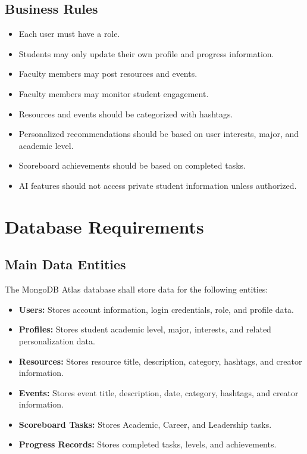 \documentclass{scrreprt}
\begin{document}
\section{Business Rules}
\begin{itemize}
    \item Each user must have a role.
    \item Students may only update their own profile and progress information.
    \item Faculty members may post resources and events.
    \item Faculty members may monitor student engagement.
    \item Resources and events should be categorized with hashtags.
    \item Personalized recommendations should be based on user interests, major, and academic level.
    \item Scoreboard achievements should be based on completed tasks.
    \item AI features should not access private student information unless authorized.
\end{itemize}

\chapter{Database Requirements}

\section{Main Data Entities}
The MongoDB Atlas database shall store data for the following entities:

\begin{itemize}
    \item \textbf{Users:} Stores account information, login credentials, role, and profile data.
    \item \textbf{Profiles:} Stores student academic level, major, interests, and related personalization data.
    \item \textbf{Resources:} Stores resource title, description, category, hashtags, and creator information.
    \item \textbf{Events:} Stores event title, description, date, category, hashtags, and creator information.
    \item \textbf{Scoreboard Tasks:} Stores Academic, Career, and Leadership tasks.
    \item \textbf{Progress Records:} Stores completed tasks, levels, and achievements.
\end{itemize}
\end{document}
